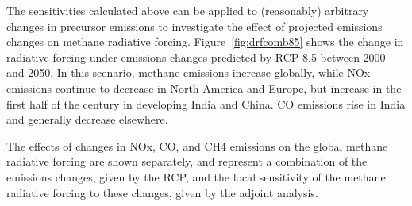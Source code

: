 The sensitivities calculated above can be applied to (reasonably) arbitrary changes in precursor emissions to investigate the effect of projected emissions changes on methane radiative forcing. Figure~\ref{fig:drfcomb85} shows the change in radiative forcing under emissions changes predicted by RCP 8.5 between 2000 and 2050. In this scenario, methane emissions increase globally, while NOx emissions continue to decrease in North America and Europe, but increase in the first half of the century in developing India and China. CO emissions rise in India and generally decrease elsewhere.

The effects of changes in NOx, CO, and CH4 emissions on the global methane radiative forcing are shown separately, and represent a combination of the emissions changes, given by the RCP, and the local sensitivity of the methane radiative forcing to these changes, given by the adjoint analysis.